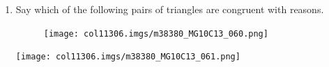 \begin{table}[H]
\begin{enumerate}[noitemsep,
label=\textbf{\arabic*}. ]



\label{m38380*id320310!!!underscore!!!media}\label{
m38380*id320310!!!underscore!!!printimage}\texttt{[image: 
col11306.imgs/m38380\_MG10C13\_059.png]} %
        
    


        
        
\label{m38380*uid126}\item Say which of the following pairs of triangles are
congruent with reasons.
    \setcounter{subfigure}{0}


	\begin{figure}[H] %
    \begin{center}
   
\label{m38380*id320512!!!underscore!!!media}\label{
m38380*id320512!!!underscore!!!printimage}\texttt{[image: col11306.imgs/m38380\_MG10C13\_060.png]} %
        
      \vspace{2pt}
    \vspace{.1in}
    
    \end{center}

 \end{figure}   

    \addtocounter{footnote}{-0}


\label{m38380*id320530!!!underscore!!!media}\label{
m38380*id320530!!!underscore!!!printimage}\texttt{[image: 
col11306.imgs/m38380\_MG10C13\_061.png]} %
        

\end{enumerate}
\end{table}
